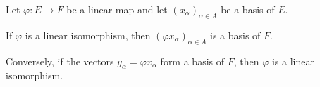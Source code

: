 Let $\varphi: E \rightarrow F$ be a linear map and let $(x_{\alpha})_{\alpha \in A}$ be a basis of $E$.

If $\varphi$ is a linear isomorphism, then $(\varphi x_{\alpha})_{\alpha \in A}$ is a basis of $F$.

Conversely, if the vectors $y_{\alpha} = \varphi x_{\alpha}$ form a basis of $F$, then $\varphi$ is a linear isomorphism.
